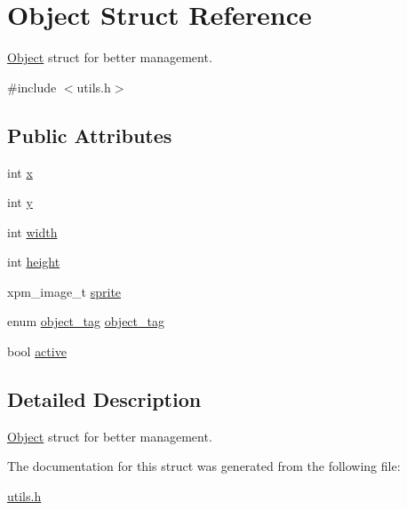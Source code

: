\hypertarget{structObject}{}\section{Object Struct Reference}
\label{structObject}


\hyperlink{structObject}{Object} struct for better management.  




{\ttfamily \#include $<$utils.\+h$>$}

\subsection*{Public Attributes}
\begin{DoxyCompactItemize}
\item 
int \hyperlink{group__utils_gaea8b4e1f4895ce5a0be5dbf42864669c}{x}
\item 
int \hyperlink{group__utils_ga9ed372592e77352c832d721ad88b9aec}{y}
\item 
int \hyperlink{group__utils_ga93596e8f620874b99326f8632365c8f5}{width}
\item 
int \hyperlink{group__utils_gacda1358783bae0b0071ae66e3fc26737}{height}
\item 
xpm\+\_\+image\+\_\+t \hyperlink{group__utils_gaa49ab131cd6d6c156d2c78c6501ba17c}{sprite}
\item 
enum \hyperlink{group__utils_ga3eff9ebd9f241e211e00b991e2ac60fc}{object\+\_\+tag} \hyperlink{group__utils_gaac0293be1f10fd2268ddeaac7184600d}{object\+\_\+tag}
\item 
bool \hyperlink{group__utils_gac16b5f9f4fa1d1787dd0937b48d62377}{active}
\end{DoxyCompactItemize}


\subsection{Detailed Description}
\hyperlink{structObject}{Object} struct for better management. 

The documentation for this struct was generated from the following file\+:\begin{DoxyCompactItemize}
\item 
\hyperlink{utils_8h}{utils.\+h}\end{DoxyCompactItemize}
